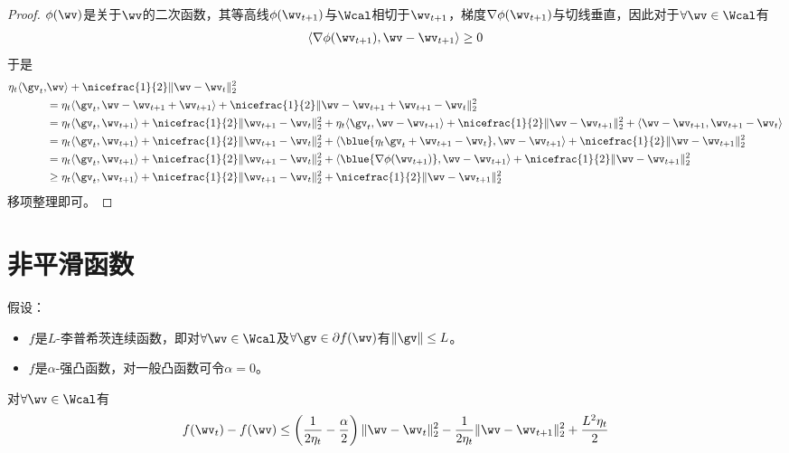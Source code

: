 \documentclass{ctexart}
\begin{document}
\begin{proof}
    $\phi(\wv)$是关于$\wv$的二次函数，其等高线$\phi(\wv_{t+1})$与$\Wcal$相切于$\wv_{t+1}$，梯度$\nabla \phi(\wv_{t+1})$与切线垂直，因此对于$\forall \wv \in \Wcal$有
    \begin{align*}
        \langle \nabla \phi(\wv_{t+1}), \wv - \wv_{t+1} \rangle \ge 0
    \end{align*}
    于是
    \begin{align*}
        \eta_t \langle \gv_t, & \wv \rangle + \nicefrac{1}{2} \| \wv - \wv_t \|_2^2 \\
        & = \eta_t \langle \gv_t, \wv - \wv_{t+1} + \wv_{t+1} \rangle + \nicefrac{1}{2} \| \wv - \wv_{t+1} + \wv_{t+1} - \wv_t \|_2^2 \\
        & = \eta_t \langle \gv_t, \wv_{t+1} \rangle + \nicefrac{1}{2} \| \wv_{t+1} - \wv_t \|_2^2 + \eta_t \langle \gv_t, \wv - \wv_{t+1} \rangle + \nicefrac{1}{2} \| \wv - \wv_{t+1} \|_2^2 + \langle \wv - \wv_{t+1}, \wv_{t+1} - \wv_t \rangle \\
        & = \eta_t \langle \gv_t, \wv_{t+1} \rangle + \nicefrac{1}{2} \| \wv_{t+1} - \wv_t \|_2^2 + \langle \blue{\eta_t \gv_t + \wv_{t+1} - \wv_t}, \wv - \wv_{t+1} \rangle + \nicefrac{1}{2} \| \wv - \wv_{t+1} \|_2^2 \\
        & = \eta_t \langle \gv_t, \wv_{t+1} \rangle + \nicefrac{1}{2} \| \wv_{t+1} - \wv_t \|_2^2 + \langle \blue{\nabla \phi(\wv_{t+1})}, \wv - \wv_{t+1} \rangle + \nicefrac{1}{2} \| \wv - \wv_{t+1} \|_2^2 \\
        & \ge \eta_t \langle \gv_t, \wv_{t+1} \rangle + \nicefrac{1}{2} \| \wv_{t+1} - \wv_t \|_2^2 + \nicefrac{1}{2} \| \wv - \wv_{t+1} \|_2^2
    \end{align*}
    移项整理即可。
\end{proof}

\section{非平滑函数}

假设：

\begin{itemize}
    \item $f$是$L$-李普希茨连续函数，即对$\forall \wv \in \Wcal$及$\forall \gv \in \partial f(\wv)$有$\|\gv\| \le L$。
    \item $f$是$\alpha$-强凸函数，对一般凸函数可令$\alpha = 0$。
\end{itemize}

\begin{lemma}
    对$\forall \wv \in \Wcal$有
    \begin{align} \label{eq: one-step-general-convex}
        f(\wv_t) - f(\wv) \le \left( \frac{1}{2\eta_t} - \frac{\alpha}{2} \right) \| \wv - \wv_t \|_2^2 - \frac{1}{2\eta_t} \| \wv - \wv_{t+1} \|_2^2 + \frac{L^2 \eta_t}{2}
    \end{align}
\end{lemma}
\end{document}
